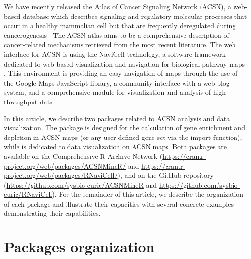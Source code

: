 We have recently released the Atlas of Cancer Signaling Network (ACSN), a
web-based database which describes signaling and regulatory molecular processes
that occur in a healthy mammalian cell but that are frequently deregulated
during cancerogenesis \citep{kuperstein2015atlas}.  The ACSN atlas aims to
be a comprehensive description of cancer-related mechanisms retrieved from the
most recent literature. The web interface for ACSN is using the NaviCell
technology, a software framework dedicated to web-based visualization and
navigation for biological pathway maps \citep{kuperstein2013navicell}. This
environment is providing an easy navigation of maps through the use of the
Google Maps JavaScript library, a community interface with a web blog system,
and a comprehensive module for visualization and analysis of high-throughput
data \citep{bonnet2015navicell}.


In this article, we describe two packages related to ACSN analysis and
data visualization. The package  is designed for the calculation of
gene enrichment and depletion in ACSN maps (or any user-defined gene set via
the import function), while  is dedicated to data visualization
on ACSN maps. Both packages are available on the Comprehensive R Archive
Network (\url{https://cran.r-project.org/web/packages/ACSNMineR/} and
\url{https://cran.r-project.org/web/packages/RNaviCell/}), and on the GitHub
repository (\url{https://github.com/sysbio-curie/ACSNMineR} and
\url{https://github.com/sysbio-curie/RNaviCell}). For the remainder of this
article, we describe the organization of each package and illustrate their
capacities with several concrete examples demonstrating their capabilities. 

\section[Packages organization]{Packages organization}

